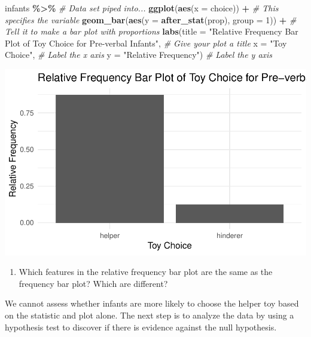 \documentclass[
]{report}
\newenvironment{Shaded}{\begin{snugshade}}{\end{snugshade}}
\newcommand{\AttributeTok}[1]{\textcolor[rgb]{0.13,0.29,0.53}{#1}}
\newcommand{\CommentTok}[1]{\textcolor[rgb]{0.56,0.35,0.01}{\textit{#1}}}
\newcommand{\DecValTok}[1]{\textcolor[rgb]{0.00,0.00,0.81}{#1}}
\newcommand{\FunctionTok}[1]{\textcolor[rgb]{0.13,0.29,0.53}{\textbf{#1}}}
\newcommand{\NormalTok}[1]{#1}
\newcommand{\SpecialCharTok}[1]{\textcolor[rgb]{0.81,0.36,0.00}{\textbf{#1}}}
\newcommand{\StringTok}[1]{\textcolor[rgb]{0.31,0.60,0.02}{#1}}
\providecommand{\tightlist}{%
  \setlength{\itemsep}{0pt}\setlength{\parskip}{0pt}}
\begin{document}
\begin{Shaded}
\begin{Highlighting}[]
\NormalTok{infants }\SpecialCharTok{\%\textgreater{}\%} \CommentTok{\# Data set piped into...}
    \FunctionTok{ggplot}\NormalTok{(}\FunctionTok{aes}\NormalTok{(}\AttributeTok{x =}\NormalTok{ choice)) }\SpecialCharTok{+}   \CommentTok{\# This specifies the variable}
    \FunctionTok{geom\_bar}\NormalTok{(}\FunctionTok{aes}\NormalTok{(}\AttributeTok{y =} \FunctionTok{after\_stat}\NormalTok{(prop), }\AttributeTok{group =} \DecValTok{1}\NormalTok{)) }\SpecialCharTok{+}  \CommentTok{\# Tell it to make a bar plot with proportions}
    \FunctionTok{labs}\NormalTok{(}\AttributeTok{title =} \StringTok{"Relative Frequency Bar Plot of Toy Choice for Pre{-}verbal Infants"}\NormalTok{,  }
       \CommentTok{\# Give your plot a title}
       \AttributeTok{x =} \StringTok{"Toy Choice"}\NormalTok{,   }\CommentTok{\# Label the x axis}
       \AttributeTok{y =} \StringTok{"Relative Frequency"}\NormalTok{)  }\CommentTok{\# Label the y axis}
\end{Highlighting}
\end{Shaded}

\begin{center}\includegraphics[width=0.5\linewidth]{03-A06-inference-1cat_test-simulation_files/figure-latex/unnamed-chunk-4-1} \end{center}

\begin{enumerate}
\def\labelenumi{\arabic{enumi}.}
\setcounter{enumi}{4}
\tightlist
\item
  Which features in the relative frequency bar plot are the same as the frequency bar plot? Which are different?
\end{enumerate}

\vspace{0.5in}

We cannot assess whether infants are more likely to choose the helper toy based on the statistic and plot alone. The next step is to analyze the data by using a hypothesis test to discover if there is evidence against the null hypothesis.
\end{document}
